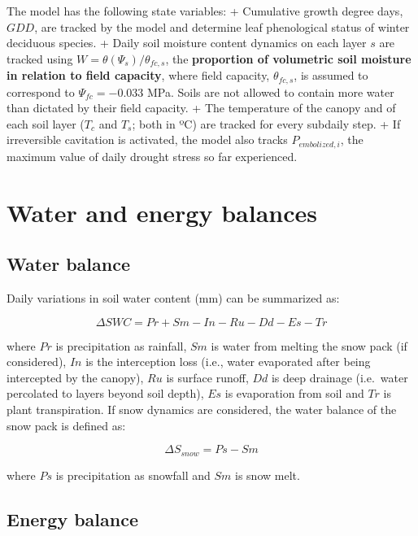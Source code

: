 \documentclass[]{book}
\begin{document}
The model has the following state variables: + Cumulative growth degree
days, \(GDD\), are tracked by the model and determine leaf phenological
status of winter deciduous species. + Daily soil moisture content
dynamics on each layer \(s\) are tracked using
\(W = \theta(\Psi_s)/ \theta_{fc,s}\), the \textbf{proportion of
volumetric soil moisture in relation to field capacity}, where field
capacity, \(\theta_{fc,s}\), is assumed to correspond to
\(\Psi_{fc} = -0.033\) MPa. Soils are not allowed to contain more water
than dictated by their field capacity. + The temperature of the canopy
and of each soil layer (\(T_c\) and \(T_s\); both in ºC) are tracked for
every subdaily step. + If irreversible cavitation is activated, the
model also tracks \(P_{embolized,i}\), the maximum value of daily
drought stress so far experienced.

\section{Water and energy balances}\label{water-and-energy-balances}

\subsection{Water balance}\label{water-balance-1}

Daily variations in soil water content (mm) can be summarized as:

\begin{equation}
\Delta{SWC} = Pr + Sm - In - Ru - Dd - Es -Tr
\end{equation}

where \(Pr\) is precipitation as rainfall, \(Sm\) is water from melting
the snow pack (if considered), \(In\) is the interception loss (i.e.,
water evaporated after being intercepted by the canopy), \(Ru\) is
surface runoff, \(Dd\) is deep drainage (i.e.~water percolated to layers
beyond soil depth), \(Es\) is evaporation from soil and \(Tr\) is plant
transpiration. If snow dynamics are considered, the water balance of the
snow pack is defined as:

\begin{equation}
\Delta{S_{snow}} = Ps - Sm
\end{equation}

where \(Ps\) is precipitation as snowfall and \(Sm\) is snow melt.

\subsection{Energy balance}\label{energy-balance}
\end{document}
